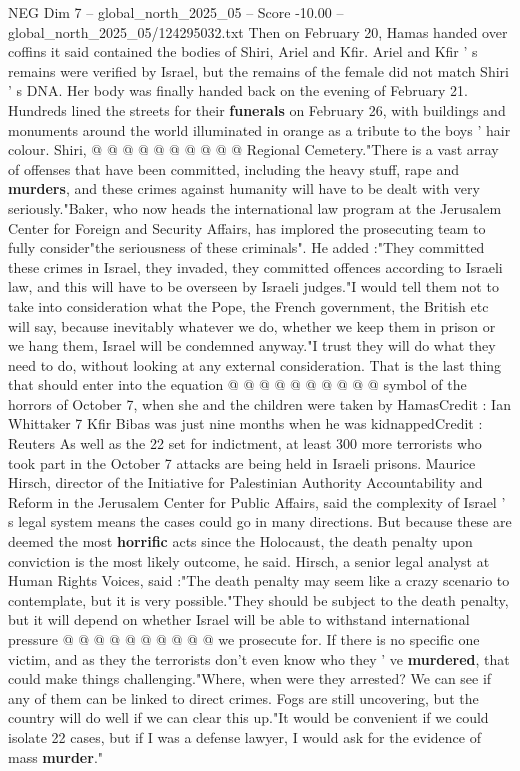 \begin{textsample}{NEG Dim 7 – global\_north\_2025\_05 – Score -10.00 – global\_north\_2025\_05/124295032.txt}
Then on February 20, Hamas handed over coffins it said contained the bodies of Shiri, Ariel and Kfir.
Ariel and Kfir ' s remains were verified by Israel, but the remains of the female did not match Shiri ' s DNA.
Her body was finally handed back on the evening of February 21.
Hundreds lined the streets for their \textbf{funerals} on February 26, with buildings and monuments around the world illuminated in orange as a tribute to the boys ' hair colour.
Shiri, @ @ @ @ @ @ @ @ @ @ Regional Cemetery."There is a vast array of offenses that have been committed, including the heavy stuff, rape and \textbf{murders}, and these crimes against humanity will have to be dealt with very seriously."Baker, who now heads the international law program at the Jerusalem Center for Foreign and Security Affairs, has implored the prosecuting team to fully consider"the seriousness of these criminals".
He added :"They committed these crimes in Israel, they invaded, they committed offences according to Israeli law, and this will have to be overseen by Israeli judges."I would tell them not to take into consideration what the Pope, the French government, the British etc will say, because inevitably whatever we do, whether we keep them in prison or we hang them, Israel will be condemned anyway."I trust they will do what they need to do, without looking at any external consideration.
That is the last thing that should enter into the equation @ @ @ @ @ @ @ @ @ @ symbol of the horrors of October 7, when she and the children were taken by HamasCredit : Ian Whittaker 7 Kfir Bibas was just nine months when he was kidnappedCredit : Reuters As well as the 22 set for indictment, at least 300 more terrorists who took part in the October 7 attacks are being held in Israeli prisons.
Maurice Hirsch, director of the Initiative for Palestinian Authority Accountability and Reform in the Jerusalem Center for Public Affairs, said the complexity of Israel ' s legal system means the cases could go in many directions.
But because these are deemed the most \textbf{horrific} acts since the Holocaust, the death penalty upon conviction is the most likely outcome, he said.
Hirsch, a senior legal analyst at Human Rights Voices, said :"The death penalty may seem like a crazy scenario to contemplate, but it is very possible."They should be subject to the death penalty, but it will depend on whether Israel will be able to withstand international pressure @ @ @ @ @ @ @ @ @ @ we prosecute for.
If there is no specific one victim, and as they the terrorists don't even know who they ' ve \textbf{murdered}, that could make things challenging."Where, when were they arrested?
We can see if any of them can be linked to direct crimes.
Fogs are still uncovering, but the country will do well if we can clear this up."It would be convenient if we could isolate 22 cases, but if I was a defense lawyer, I would ask for the evidence of mass \textbf{murder}."

\end{textsample}
